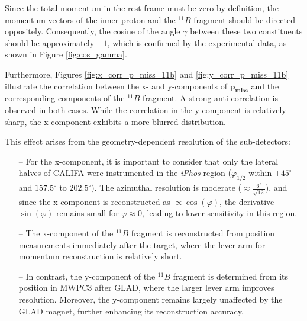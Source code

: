 Since the total momentum in the rest frame must be zero by definition, the momentum vectors of the inner proton and the $^{11}B$ fragment should be directed oppositely. Consequently, the cosine of the angle $\gamma$ between these two constituents should be approximately $-1$, which is confirmed by the experimental data, as shown in Figure \ref{fig:cos_gamma}.\newline

Furthermore, Figures \ref{fig:x_corr_p_miss_11b} and \ref{fig:y_corr_p_miss_11b} illustrate the correlation between the x- and y-components of $\mathbf{p_{miss}}$ and the corresponding components of the $^{11}B$ fragment. A strong anti-correlation is observed in both cases. While the correlation in the y-component is relatively sharp, the x-component exhibits a more blurred distribution.\newline

This effect arises from the geometry-dependent resolution of the sub-detectors:
\begin{itemize}
\item[--]For the x-component, it is important to consider that only the lateral halves of CALIFA were instrumented in the \textit{iPhos} region ($\varphi_{1/2}$ within $\pm 45^{\circ}$ and $157.5^{\circ}$ to $202.5^{\circ}$). The azimuthal resolution is moderate ($\approx \frac{6^{\circ}}{\sqrt{12}}$), and since the x-component is reconstructed as $\propto \cos(\varphi)$, the derivative $\sin(\varphi)$ remains small for $\varphi \approx 0$, leading to lower sensitivity in this region.
\item[--] The x-component of the $^{11}B$ fragment is reconstructed from position measurements immediately after the target, where the lever arm for momentum reconstruction is relatively short.
\item[--]In contrast, the y-component of the $^{11}B$ fragment is determined from its position in MWPC3 after GLAD, where the larger lever arm improves resolution. Moreover, the y-component remains largely unaffected by the GLAD magnet, further enhancing its reconstruction accuracy.
\end{itemize}

